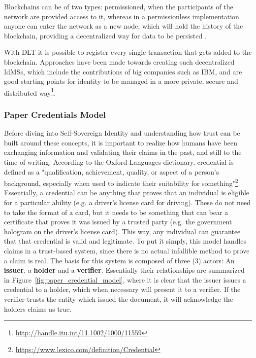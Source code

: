Blockchains can be of two types: permissioned, when the participants of the network are provided access to it, whereas in a permissionless implementation anyone can enter the network as a new node, which will hold the history of the blockchain, providing a decentralized way for data to be persisted \cite{s18082575} \cite{inbookWang}. 

With DLT it is possible to register every single transaction that gets added to the blockchain. Approaches have been made towards creating such decentralized IdMSs, which include the contributions of big companies such as IBM, and are good starting points for identity to be managed in a more private, secure and distributed way\footnote{\url{http://handle.itu.int/11.1002/1000/11559}}. 

\subsubsection{Paper Credentials Model}
\label{subsubsec:paper_credential_model}

Before diving into Self-Sovereign Identity and understanding how trust can be built around these concepts, it is important to realize how humans have been exchanging information and validating their claims in the past, and still to the time of writing. According to the Oxford Languages dictionary, credential is defined as a "qualification, achievement, quality, or aspect of a person's background, especially when used to indicate their suitability for something"\footnote{\url{https://www.lexico.com/definition/Credential}}. Essentially, a credential can be anything that proves that an individual is eligible for a particular ability (e.g. a driver's license card for driving). These do not need to take the format of a card, but it needs to be something that can bear a certificate that proves it was issued by a trusted party (e.g. the government hologram on the driver's license card). This way, any individual can guarantee that that credential is valid and legitimate. To put it simply, this model handles claims in a trust-based system, since there is no actual infallible method to prove a claim is real.
The basis for this system is composed of three (3) actors: An \textbf{issuer}, a \textbf{holder} and a \textbf{verifier}. Essentially their relationships are summarized in Figure~\ref{fig:paper_credential_model}, where it is clear that the issuer issues a credential to a holder, which when necessary will present it to a verifier. If the verifier trusts the entity which issued the document, it will acknowledge the holders claims as true. 

